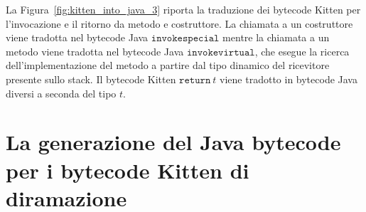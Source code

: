 La Figura~\ref{fig:kitten_into_java_3} riporta la traduzione dei bytecode Kitten per
l'invocazione e il ritorno da metodo e costruttore. La chiamata a un costruttore
viene tradotta nel bytecode Java $\mathtt{invokespecial}$ mentre la chiamata a
un metodo viene tradotta nel bytecode Java $\mathtt{invokevirtual}$, che esegue la
ricerca dell'implementazione del metodo a partire dal tipo dinamico del ricevitore
presente sullo stack. Il bytecode Kitten $\mathtt{return}\ \mathit{t}$ viene tradotto
in bytecode Java diversi a seconda del tipo $\mathit{t}$.

\section{La generazione del Java bytecode per i bytecode Kitten di diramazione}
  \label{sec:java_bytecode_diramazione}

